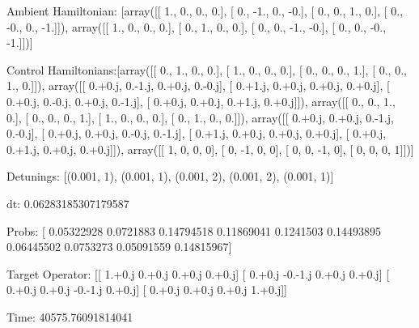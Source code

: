 \documentclass{article}
\begin{document}
    

\newpage

Ambient Hamiltonian: [array([[ 1.,  0.,  0.,  0.],
       [ 0., -1.,  0., -0.],
       [ 0.,  0.,  1.,  0.],
       [ 0., -0.,  0., -1.]]), array([[ 1.,  0.,  0.,  0.],
       [ 0.,  1.,  0.,  0.],
       [ 0.,  0., -1., -0.],
       [ 0.,  0., -0., -1.]])]

Control Hamiltonians:[array([[ 0.,  1.,  0.,  0.],
       [ 1.,  0.,  0.,  0.],
       [ 0.,  0.,  0.,  1.],
       [ 0.,  0.,  1.,  0.]]), array([[ 0.+0.j,  0.-1.j,  0.+0.j,  0.-0.j],
       [ 0.+1.j,  0.+0.j,  0.+0.j,  0.+0.j],
       [ 0.+0.j,  0.-0.j,  0.+0.j,  0.-1.j],
       [ 0.+0.j,  0.+0.j,  0.+1.j,  0.+0.j]]), array([[ 0.,  0.,  1.,  0.],
       [ 0.,  0.,  0.,  1.],
       [ 1.,  0.,  0.,  0.],
       [ 0.,  1.,  0.,  0.]]), array([[ 0.+0.j,  0.+0.j,  0.-1.j,  0.-0.j],
       [ 0.+0.j,  0.+0.j,  0.-0.j,  0.-1.j],
       [ 0.+1.j,  0.+0.j,  0.+0.j,  0.+0.j],
       [ 0.+0.j,  0.+1.j,  0.+0.j,  0.+0.j]]), array([[ 1,  0,  0,  0],
       [ 0, -1,  0,  0],
       [ 0,  0, -1,  0],
       [ 0,  0,  0,  1]])]

Detunings: [(0.001, 1), (0.001, 1), (0.001, 2), (0.001, 2), (0.001, 1)]

 dt: 0.06283185307179587

Probs: [ 0.05322928  0.0721883   0.14794518  0.11869041  0.1241503   0.14493895
  0.06445502  0.0753273   0.05091559  0.14815967]

Target Operator: [[ 1.+0.j  0.+0.j  0.+0.j  0.+0.j]
 [ 0.+0.j -0.-1.j  0.+0.j  0.+0.j]
 [ 0.+0.j  0.+0.j -0.-1.j  0.+0.j]
 [ 0.+0.j  0.+0.j  0.+0.j  1.+0.j]]

Time: 40575.76091814041
\end{document}
